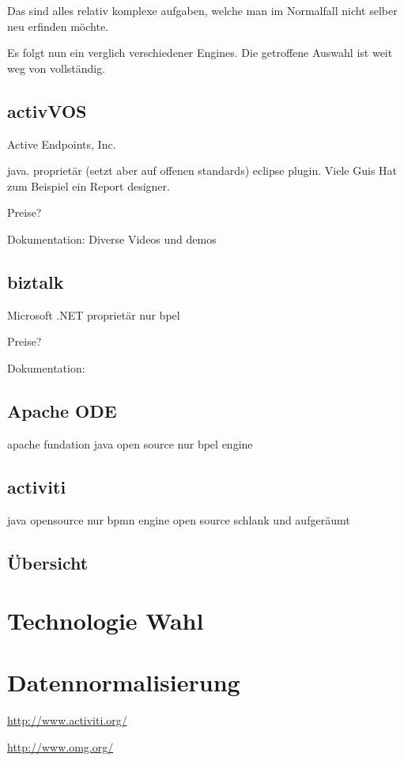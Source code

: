 \documentclass[paper=a4,twoside=false,BCOR=0mm,DIV=calc,fontsize=12pt]{scrartcl}
\begin{document}
Das sind alles relativ komplexe aufgaben, welche man im Normalfall nicht selber neu erfinden möchte.

Es folgt nun ein verglich verschiedener Engines. Die getroffene Auswahl ist weit weg von vollständig.



\subsection{activVOS}
Active Endpoints, Inc. 

java. 
proprietär (setzt aber auf offenen standards)
eclipse plugin.
Viele Guis
Hat zum Beispiel ein Report designer.

Preise?

Dokumentation:
Diverse Videos und demos

\subsection{biztalk}
Microsoft
.NET
proprietär
nur bpel


Preise?

Dokumentation:


\subsection{Apache ODE}
apache fundation
java
open source
nur bpel engine



\subsection{activiti}
java
opensource
nur bpmn engine
open source
schlank und aufgeräumt



\subsection{Übersicht}




\section{Technologie Wahl}



\section{Datennormalisierung}





\begin{thebibliography}{99}

 \url{http://www.activiti.org/}

 \url{http://www.omg.org/}




\end{thebibliography}
\end{document}
